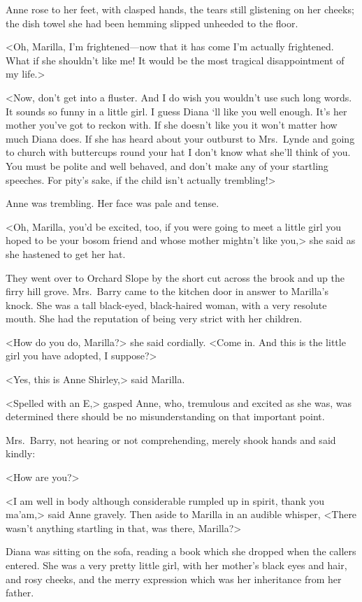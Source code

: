 Anne rose to her feet, with clasped hands, the tears still glistening on her cheeks; the dish towel she had been hemming slipped unheeded to the floor.

<Oh, Marilla, I'm frightened—now that it has come I'm actually frightened. What if she shouldn't like me! It would be the most tragical disappointment of my life.>

<Now, don't get into a fluster. And I do wish you wouldn't use such long words. It sounds so funny in a little girl. I guess Diana `ll like you well enough. It's her mother you've got to reckon with. If she doesn't like you it won't matter how much Diana does. If she has heard about your outburst to Mrs.~Lynde and going to church with buttercups round your hat I don't know what she'll think of you. You must be polite and well behaved, and don't make any of your startling speeches. For pity's sake, if the child isn't actually trembling!>

Anne was trembling. Her face was pale and tense.

<Oh, Marilla, you'd be excited, too, if you were going to meet a little girl you hoped to be your bosom friend and whose mother mightn't like you,> she said as she hastened to get her hat.

They went over to Orchard Slope by the short cut across the brook and up the firry hill grove. Mrs.~Barry came to the kitchen door in answer to Marilla's knock. She was a tall black-eyed, black-haired woman, with a very resolute mouth. She had the reputation of being very strict with her children.

<How do you do, Marilla?> she said cordially. <Come in. And this is the little girl you have adopted, I suppose?>

<Yes, this is Anne Shirley,> said Marilla.

<Spelled with an E,> gasped Anne, who, tremulous and excited as she was, was determined there should be no misunderstanding on that important point.

Mrs.~Barry, not hearing or not comprehending, merely shook hands and said kindly:

<How are you?>

<I am well in body although considerable rumpled up in spirit, thank you ma'am,> said Anne gravely. Then aside to Marilla in an audible whisper, <There wasn't anything startling in that, was there, Marilla?>

Diana was sitting on the sofa, reading a book which she dropped when the callers entered. She was a very pretty little girl, with her mother's black eyes and hair, and rosy cheeks, and the merry expression which was her inheritance from her father.


